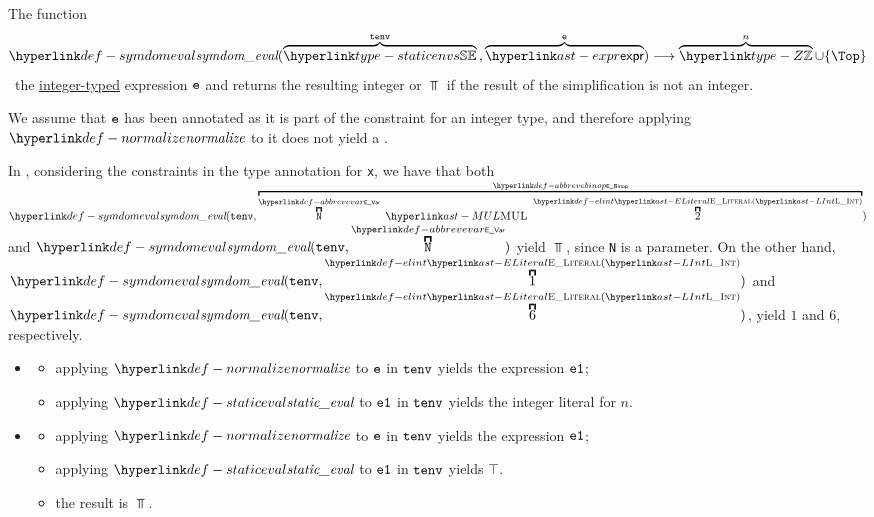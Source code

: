 \hypertarget{def-symdomeval}{}
The function
\[
\symdomeval(
  \overname{\staticenvs}{\tenv} \aslsep
  \overname{\expr}{\ve}
) \aslto \overname{\Z}{n} \cup \{\Top\}
\]
\symbolicallysimplifiesterm\ the \underline{integer-typed} expression $\texttt{e}$ and returns the resulting integer or $\Top$ if
the result of the simplification is not an integer.

We assume that $\texttt{e}$ has been annotated as it is part of the constraint for an integer type,
and therefore applying $\normalize$ to it does not yield a \typingerrorterm{}.

In , considering the constraints in the type annotation for
\verb|x|,
we have that both
$\symdomeval(\tenv, \AbbrevEBinop{\MUL}{\AbbrevEVar{\vN}}{\ELInt{2}})$
and $\symdomeval(\tenv, \AbbrevEVar{\vN})$ yield $\Top$,
since \verb|N| is a parameter.
On the other hand, $\symdomeval(\tenv, \ELInt{1})$ and $\symdomeval(\tenv, \ELInt{6})$,
yield $1$ and $6$, respectively.

\ProseParagraph
\OneApplies
\begin{itemize}
  \item {}
  \begin{itemize}
    \item applying $\normalize$ to $\texttt{e}$ in $\texttt{tenv}$ yields the expression $\texttt{e1}$;
    \item applying $\staticeval$ to $\texttt{e1}$ in $\texttt{tenv}$ yields the integer literal for $n$.
  \end{itemize}

  \item {}
  \begin{itemize}
    \item applying $\normalize$ to $\texttt{e}$ in $\texttt{tenv}$ yields the expression $\texttt{e1}$;
    \item applying $\staticeval$ to $\texttt{e1}$ in $\texttt{tenv}$ yields $\top$.
    \item the result is $\Top$.
  \end{itemize}
\end{itemize}

\FormallyParagraph
{}

